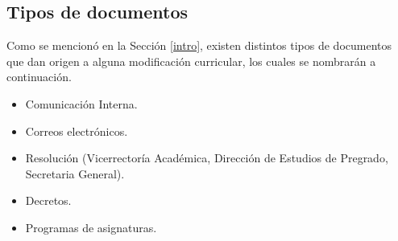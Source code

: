 	

\subsection{Tipos de documentos}



Como se mencionó en la Sección \ref{intro}, existen distintos  tipos de documentos que  dan origen a  alguna modificación curricular, los cuales se nombrarán a continuación.

\begin{itemize}
	\item Comunicación Interna.
	\item Correos electrónicos.
	\item  Resolución (Vicerrectoría Académica, Dirección de Estudios de Pregrado, Secretaria General).
	\item Decretos.
	\item Programas de asignaturas.
\end{itemize}




